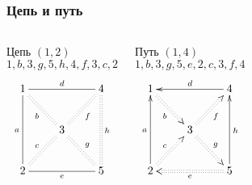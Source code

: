 \begin{frame}
    \frametitle{Цепь и путь}

    \begin{columns}
            \begin{block}{Цепь $(1,2)$\\$1,b,3,g,5,h,4,f,3,c,2$}
                \[
                    {\xymatrix{
                        1 \ar@{-}[dd]_{a} \ar@{-}[rr]^{d} \ar@{:}[dr]_{b}
                            &*{}
                                &4 \ar@{:}[dd]^{h}
                                    \\
                        *{} 
                            &3 \ar@{:}[ur]_{f} \ar@{:}[dr]^{g}
                                &*{}
                                    \\
                        2  \ar@{:}[ur]^{c} \ar@{-}[rr]_{e}
                            &*{}
                                &5
                    }}
                \]
            \end{block}
        
            \begin{block}{Путь $(1,4)$\\$1,b,3,g,5,e,2,c,3,f,4$}
                \[
                    {\xymatrix{
                        1 \ar@{<-}[dd]_{a} \ar@{<-}[rr]^{d} \ar@{:>}[dr]_{b}
                            &*{}
                                &4 \ar@{<-}[dd]^{h}
                                    \\
                        *{} 
                            &3 \ar@{:>}[ur]_{f} \ar@{:>}[dr]^{g}
                                &*{}
                                    \\
                        2  \ar@{:>}[ur]^{c} \ar@{<:}[rr]_{e}
                            &*{}
                                &5
                    }}
                \]
            \end{block}
    \end{columns}    
\end{frame}

